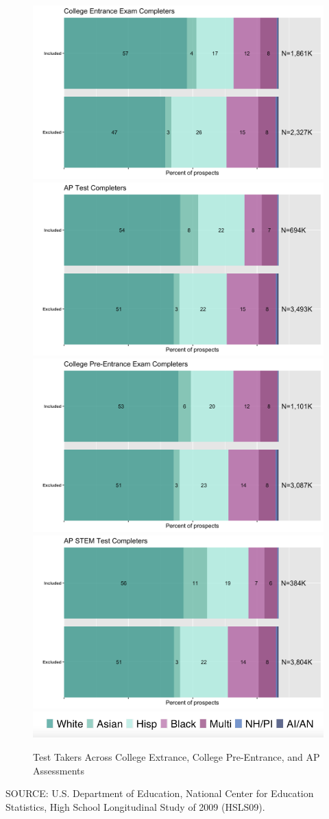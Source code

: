 \documentclass[
  12pt,
]{article}
\begin{document}
\begin{landscape}


\begin{figure}

{\centering \includegraphics[width=0.4\linewidth]{./../../outputs/figures/p1_sat} \includegraphics[width=0.4\linewidth]{./../../outputs/figures/p1_ap} \includegraphics[width=0.4\linewidth]{./../../outputs/figures/p1_psat} \includegraphics[width=0.4\linewidth]{./../../outputs/figures/p1_apstem} \includegraphics[width=0.4\linewidth]{./../../outputs/figures/legend_horizontal} 

}

\caption{Test Takers Across College Extrance, College Pre-Entrance, and AP Assessments}\label{fig:test-takers}
\end{figure}

\begingroup
\fontsize{8}{8}\selectfont
SOURCE: U.S. Department of Education, National Center for Education Statistics, High School Longitudinal Study of 2009 (HSLS09).
\endgroup


\end{landscape}
\end{document}

